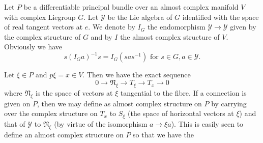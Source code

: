 Let $P$ be a differentiable principal bundle over an almost complex
manifold $V$ with complex Lie\pageoriginale group $G$. Let $\mathscr{Y}$ be the Lie
algebra of $G$ identified with the space of real tangent vectors at
$e$. We denote by $I_G$ the endomorphism $\mathscr{Y} \to \mathscr{Y}
$ given by the complex structure of $G$ and by $I$ the almost complex
structure of $V$. Obviously we have 
$$
s(I_G a)^{-1}s = I_G (sas ^{-1}) \text{ for } s \in G, a \in \mathscr{Y}.
$$

Let $\xi \in P$ and $p \xi = x \in V$. Then we have the exact sequence
$$
0 \to \mathfrak{N}_\xi \to T_\xi \to T_x \to 0
$$
where $\mathfrak{N}_\xi$ is the space of vectors at $\xi$ tangential to the
fibre. If a connection is given on $P$, then we may define as almost
complex structure on $P$ by carrying over the complex structure on
$T_x$ to $S_\xi$ (the space of horizontal vectors at $\xi$) and that
of $\mathscr{Y}$ to $\mathfrak{N}_\xi$ (by virtue of the isomorphism $a \to \xi
a$). This is easily seen to define an almost complex structure on $P$
so that we have the 

